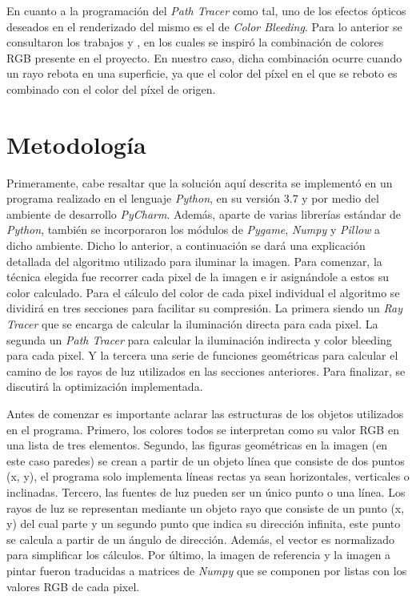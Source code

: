 \documentclass[conference]{IEEEtran}
\begin{document}
En cuanto a la programación del \textit{Path Tracer} como tal, uno de los efectos ópticos deseados en el renderizado del mismo es el de \textit{Color Bleeding}. Para lo anterior se consultaron los trabajos \cite{b4} y \cite{b5}, en los cuales se inspiró la combinación de colores RGB presente en el proyecto. En nuestro caso, dicha combinación ocurre cuando un rayo rebota en una superficie, ya que el color del píxel en el que se reboto es combinado con el color del píxel de origen.

\section{Metodología}
Primeramente, cabe resaltar que la solución aquí descrita se implementó en un programa realizado en el lenguaje \textit{Python}, en su versión 3.7 y por medio del ambiente de desarrollo \textit{PyCharm}. Además, aparte de varias librerías estándar de \textit{Python}, también se incorporaron los módulos de \textit{Pygame}, \textit{Numpy} y \textit{Pillow} a dicho ambiente. Dicho lo anterior, a continuación se dará una explicación detallada del algoritmo utilizado para iluminar la imagen. Para comenzar, la técnica elegida fue recorrer cada pixel de la imagen e ir asignándole a estos su color calculado. Para el cálculo del color de cada pixel individual el algoritmo se dividirá en tres secciones para facilitar su compresión. La primera siendo un \textit{Ray Tracer} que se encarga de calcular la iluminación directa para cada pixel. La segunda un \textit{Path Tracer} para calcular la iluminación indirecta y color bleeding para cada pixel. Y la tercera una serie de funciones geométricas para calcular el camino de los rayos de luz utilizados en las secciones anteriores. Para finalizar, se discutirá la optimización implementada. 

Antes de comenzar es importante aclarar las estructuras de los objetos utilizados en el programa. Primero, los colores todos se interpretan como su valor RGB en una lista de tres elementos. Segundo, las figuras geométricas en la imagen (en este caso paredes) se crean a partir de un objeto línea que consiste de dos puntos (x, y), el programa solo implementa líneas rectas ya sean horizontales, verticales o inclinadas. Tercero, las fuentes de luz pueden ser un único punto o una línea. Los rayos de luz se representan mediante un objeto rayo que consiste de un punto (x, y) del cual parte y un segundo punto que indica su dirección infinita, este punto se calcula a partir de un ángulo de dirección. Además, el vector es normalizado para simplificar los cálculos. Por último, la imagen de referencia y la imagen a pintar fueron traducidas a matrices de \textit{Numpy} que se componen por listas con los valores RGB de cada pixel. 
\end{document}

